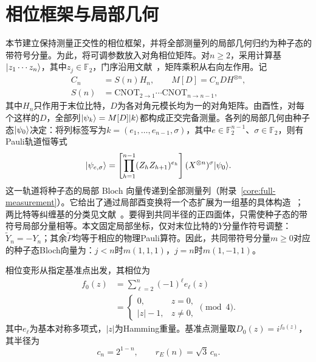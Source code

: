 \section{相位框架与局部几何}
\label{core:framework}

本节建立保持测量正交性的相位框架，并将全部测量列的局部几何归约为种子态的带符号分量。为此，将可调参数放入对角相位矩阵。对$n\ge2$，采用计算基$\lvert z_1\cdots z_n\rangle$，其中$z_j\in\mathbb F_2$，门序沿用文献~\cite{PauwelsGisin2026}，矩阵乘积从右向左作用。记
\begin{align}
 C_n&=S(n)H_n,\qquad M[D]=C_nDH^{\otimes n},\nonumber\\
 S(n)&=\mathrm{CNOT}_{2\to1}\cdots\mathrm{CNOT}_{n\to n-1},
 \label{core:phase-family}
\end{align}
其中$H_n$只作用于末位比特，$D$为各对角元模长均为一的对角矩阵。由酉性，对每个这样的$D$，全部列$\lvert \psi_k\rangle=M[D]\lvert k\rangle$都构成正交完备测量。各列的局部几何由种子态$\lvert \psi_0\rangle$决定：将列标签写为$k=(e_1,\ldots,e_{n-1},\sigma)$，其中$e\in\mathbb F_2^{n-1}$、$\sigma\in\mathbb F_2$，则有Pauli轨道恒等式
\begin{equation}
 \lvert \psi_{e,\sigma}\rangle=
 \left[\prod_{h=1}^{n-1}(Z_hZ_{h+1})^{e_h}\right]
 (X^{\otimes n})^\sigma\lvert \psi_0\rangle.
 \label{core:orbit}
\end{equation}
这一轨道将种子态的局部 Bloch 向量传递到全部测量列（附录~\ref{core:full-measurement}）。它给出了通过局部酉变换将一个态扩展为一组基的具体构造~\cite{Pimpel2023}；两比特等纠缠基的分类见文献~\cite{DelSanto2024}。要得到共同半径的正四面体，只需使种子态的带符号局部分量相等。本文固定局部坐标，仅对末位比特的$Y$分量作符号调整：$\widetilde Y_n=-Y_n$；其余$\widetilde P$均等于相应的物理Pauli算符。因此，共同带符号分量$m\ge0$对应的种子态Bloch向量为：$j<n$时$m(1,1,1)$，$j=n$时$m(1,-1,1)$。

相位变形从指定基准点出发，其相位为
\begin{equation}
 \begin{aligned}
 f_0(z)&=\sum_{\ell=2}^n(-1)^\ell e_\ell(z)\\
 &=\begin{cases}0,&z=0,\\ |z|-1,&z\ne0,\end{cases}\pmod4.
 \end{aligned}
 \label{core:reference-phase}
\end{equation}
其中$e_\ell$为基本对称多项式，$|z|$为Hamming重量。基准点测量取$D_0(z)=i^{f_0(z)}$，其半径为
\begin{equation}
 c_n=2^{1-n},\qquad r_E(n)=\sqrt3\,c_n.
 \label{core:reference-radius}
\end{equation}

